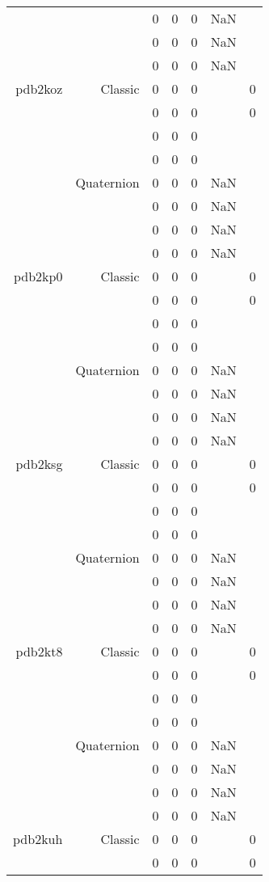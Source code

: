 \begin{xltabular}{\textwidth}{r|rcccSc}
& & 0 & 0 & 0 & NaN & \\
& & 0 & 0 & 0 & NaN & \\
& & 0 & 0 & 0 & NaN & \\ \addlinespace
pdb2koz & Classic & 0 & 0 & 0 & & 0 \\
& & 0 & 0 & 0 & & 0 \\
& & 0 & 0 & 0 & & \\
& & 0 & 0 & 0 & & \\
& Quaternion & 0 & 0 & 0 & NaN & \\
& & 0 & 0 & 0 & NaN & \\
& & 0 & 0 & 0 & NaN & \\
& & 0 & 0 & 0 & NaN & \\ \addlinespace
pdb2kp0 & Classic & 0 & 0 & 0 & & 0 \\
& & 0 & 0 & 0 & & 0 \\
& & 0 & 0 & 0 & & \\
& & 0 & 0 & 0 & & \\
& Quaternion & 0 & 0 & 0 & NaN & \\
& & 0 & 0 & 0 & NaN & \\
& & 0 & 0 & 0 & NaN & \\
& & 0 & 0 & 0 & NaN & \\ \addlinespace
pdb2ksg & Classic & 0 & 0 & 0 & & 0 \\
& & 0 & 0 & 0 & & 0 \\
& & 0 & 0 & 0 & & \\
& & 0 & 0 & 0 & & \\
& Quaternion & 0 & 0 & 0 & NaN & \\
& & 0 & 0 & 0 & NaN & \\
& & 0 & 0 & 0 & NaN & \\
& & 0 & 0 & 0 & NaN & \\ \addlinespace
pdb2kt8 & Classic & 0 & 0 & 0 & & 0 \\
& & 0 & 0 & 0 & & 0 \\
& & 0 & 0 & 0 & & \\
& & 0 & 0 & 0 & & \\
& Quaternion & 0 & 0 & 0 & NaN & \\
& & 0 & 0 & 0 & NaN & \\
& & 0 & 0 & 0 & NaN & \\
& & 0 & 0 & 0 & NaN & \\ \addlinespace
pdb2kuh & Classic & 0 & 0 & 0 & & 0 \\
& & 0 & 0 & 0 & & 0 \\

\end{xltabular}
